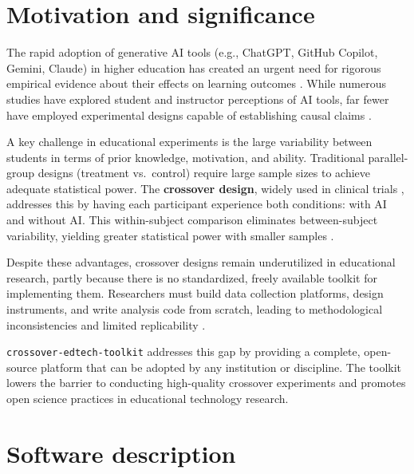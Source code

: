 \documentclass[authoryear,preprint,review,12pt]{elsarticle}
\begin{document}
\section{Motivation and significance}
\label{sec:motivation}

The rapid adoption of generative AI tools (e.g., ChatGPT, GitHub Copilot, Gemini,
Claude) in higher education has created an urgent need for rigorous empirical
evidence about their effects on learning outcomes \citep{kasneci2023chatgpt}.
While numerous studies have explored student and instructor perceptions of AI
tools, far fewer have employed experimental designs capable of establishing
causal claims \citep{crompton2023ai, yan2024practical}.

A key challenge in educational experiments is the large variability between
students in terms of prior knowledge, motivation, and ability. Traditional
parallel-group designs (treatment vs.\ control) require large sample sizes to
achieve adequate statistical power. The \textbf{crossover design}, widely used
in clinical trials \citep{senn2002crossover}, addresses this by having each
participant experience both conditions: with AI and without AI. This
within-subject comparison eliminates between-subject variability, yielding
greater statistical power with smaller samples \citep{wellek2012crossover,
jones2014crossover}.

Despite these advantages, crossover designs remain underutilized in educational
research, partly because there is no standardized, freely available toolkit for
implementing them. Researchers must build data collection platforms, design
instruments, and write analysis code from scratch, leading to methodological
inconsistencies and limited replicability \citep{nosek2015promoting}.

\texttt{crossover-edtech-toolkit} addresses this gap by providing a complete,
open-source platform that can be adopted by any institution or discipline.
The toolkit lowers the barrier to conducting high-quality crossover experiments
and promotes open science practices in educational technology research.

\section{Software description}
\label{sec:description}
\end{document}
